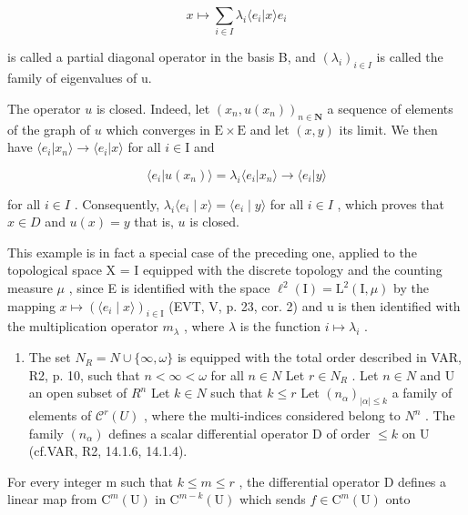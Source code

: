 \[
x \mapsto \sum_ {i \in I} \lambda_ {i} \langle e _ {i} | x \rangle e _ {i}
\]

is called a partial diagonal operator in the basis B, and \((\lambda_{i})_{i\in I}\) is called the family of eigenvalues of u.

The operator \(u\) is closed. Indeed, let \((x_{n}, u(x_{n}))_{n \in \mathbf{N}}\) a sequence of elements of the graph of \(u\) which converges in \(\mathrm{E} \times \mathrm{E}\) and let \((x, y)\) its limit. We then have \(\langle e_{i} | x_{n} \rangle \to \langle e_{i} | x \rangle\) for all \(i \in \mathrm{I}\) and

\[
\langle e _ {i} | u (x _ {n}) \rangle = \lambda_ {i} \langle e _ {i} | x _ {n} \rangle \rightarrow \langle e _ {i} | y \rangle
\]

for all \(i \in I\) . Consequently, \(\lambda_{i} \langle e_{i} \mid x \rangle = \langle e_{i} \mid y \rangle\) for all \(i \in I\) , which proves that \(x \in D\) and \(u(x) = y\) that is, \(u\) is closed.

This example is in fact a special case of the preceding one, applied to the topological space X = I equipped with the discrete topology and the counting measure \(\mu\) , since E is identified with the space \(\ell^{2}(\mathrm{I}) = \mathrm{L}^{2}(\mathrm{I}, \mu)\) by the mapping \(x \mapsto (\langle e_{i} \mid x \rangle)_{i \in \mathrm{I}}\) (EVT, V, p. 23, cor. 2) and u is then identified with the multiplication operator \(m_{\lambda}\) , where \(\lambda\) is the function \(i \mapsto \lambda_{i}\) .

\begin{enumerate}
\def\labelenumi{\arabic{enumi})}
\setcounter{enumi}{2}
\tightlist
\item
  The set \(N_{R} = N \cup \{\infty, \omega\}\) is equipped with the total order described in VAR, R2, p. 10, such that \(n < \infty < \omega\) for all \(n \in N\) Let \(r \in N_{R}\) . Let \(n \in N\) and U an open subset of \(R^{n}\) Let \(k \in N\) such that \(k \leqslant r\) Let \((n_{\alpha})_{|\alpha| \leqslant k}\) a family of elements of \(\mathcal{C}^{r}(U)\) , where the multi-indices considered belong to \(N^{n}\) . The family \((n_{\alpha})\) defines a scalar differential operator D of order \(\leqslant k\) on U (cf.VAR, R2, 14.1.6, 14.1.4).
\end{enumerate}

For every integer m such that \(k \leqslant m \leqslant r\) , the differential operator D defines a linear map from \(\mathrm{C}^{m}(\mathrm{U})\) in \(\mathrm{C}^{m-k}(\mathrm{U})\) which sends \(f \in \mathrm{C}^{m}(\mathrm{U})\) onto

